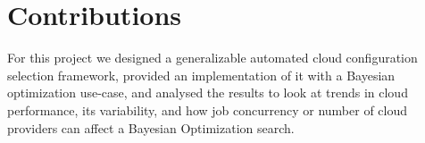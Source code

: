 \documentclass{report}
\begin{document}
%

\section{Contributions}
For this project we designed a generalizable automated cloud configuration selection framework, provided an implementation of it with a Bayesian optimization use-case, and analysed the results to look at trends in cloud performance, its variability, and how job concurrency or number of cloud providers can affect a Bayesian Optimization search.
\end{document}
